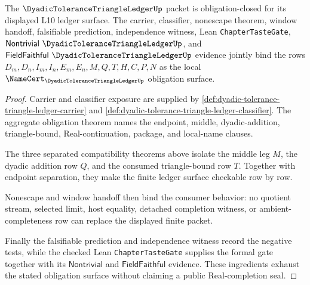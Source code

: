 \begin{theorem}
\label{thm:dyadic-tolerance-triangle-ledger-tastegate-obligation-closure}
The $\DyadicToleranceTriangleLedgerUp$ packet is obligation-closed for its displayed L10 ledger surface. The carrier, classifier, nonescape theorem, window handoff, falsifiable prediction, independence witness, Lean \texttt{ChapterTasteGate}, $\mathsf{Nontrivial}\ \DyadicToleranceTriangleLedgerUp$, and $\mathsf{FieldFaithful}\ \DyadicToleranceTriangleLedgerUp$ evidence jointly bind the rows $D_m,D_n,I_m,I_n,E_m,E_n,M,Q,T,H,C,P,N$ as the local $\NameCert_{\DyadicToleranceTriangleLedgerUp}$ obligation surface.
\end{theorem}
\begin{proof}
Carrier and classifier exposure are supplied by \autoref{def:dyadic-tolerance-triangle-ledger-carrier} and \autoref{def:dyadic-tolerance-triangle-ledger-classifier}. The aggregate obligation theorem names the endpoint, middle, dyadic-addition, triangle-bound, Real-continuation, package, and local-name clauses.

The three separated compatibility theorems above isolate the middle leg $M$, the dyadic addition row $Q$, and the consumed triangle-bound row $T$. Together with endpoint separation, they make the finite ledger surface checkable row by row.

Nonescape and window handoff then bind the consumer behavior: no quotient stream, selected limit, host equality, detached completion witness, or ambient-completeness row can replace the displayed finite packet.

Finally the falsifiable prediction and independence witness record the negative tests, while the checked Lean \texttt{ChapterTasteGate} supplies the formal gate together with its $\mathsf{Nontrivial}$ and $\mathsf{FieldFaithful}$ evidence. These ingredients exhaust the stated obligation surface without claiming a public Real-completion seal.
\end{proof}



